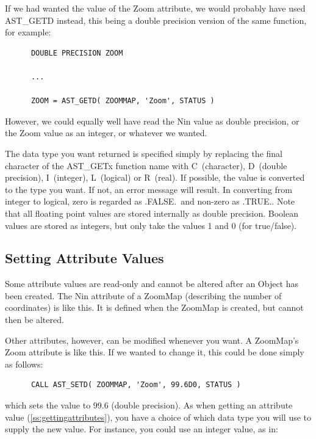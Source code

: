 \documentclass[twoside,11pt]{article}
\newcommand{\htmlref}[2]{#1}
\newcommand{\secref}[1]{\S\ref{#1}}
\renewcommand{\secref}[1]{\ref{#1}}
\begin{document}
If we had wanted the value of the \htmlref{Zoom}{Zoom} attribute, we would probably
have used AST\_GETD instead, this being a double precision version of
the same function, for example:

\small
\begin{verbatim}
      DOUBLE PRECISION ZOOM

      ...

      ZOOM = AST_GETD( ZOOMMAP, 'Zoom', STATUS )
\end{verbatim}
\normalsize

However, we could equally well have read the Nin value as double
precision, or the Zoom value as an integer, or whatever we wanted.

The data type you want returned is specified simply by replacing the
final character of the AST\_GETx function name with C~(character),
D~(double precision), I~(integer), L~(logical) or R~(real). If
possible, the value is converted to the type you want. If not, an
error message will result. In converting from integer to logical, zero
is regarded as .FALSE.\ and non-zero as .TRUE.. Note that all floating
point values are stored internally as double precision. Boolean values
are stored as integers, but only take the values 1 and 0 (for
true/false).

\subsection{\label{ss:settingattributes}Setting Attribute Values}

Some attribute values are read-only and cannot be altered after an
\htmlref{Object}{Object} has been created. The \htmlref{Nin}{Nin} attribute of a \htmlref{ZoomMap}{ZoomMap} (describing
the number of coordinates) is like this. It is defined when the
ZoomMap is created, but cannot then be altered.

Other attributes, however, can be modified whenever you want. A
ZoomMap's \htmlref{Zoom}{Zoom} attribute is like this. If we wanted to change it, this
could be done simply as follows:

\small
\begin{verbatim}
      CALL AST_SETD( ZOOMMAP, 'Zoom', 99.6D0, STATUS )
\end{verbatim}
\normalsize

which sets the value to 99.6 (double precision). As when getting an
attribute value (\secref{ss:gettingattributes}), you have a choice of
which data type you will use to supply the new value. For instance,
you could use an integer value, as in:
\end{document}
